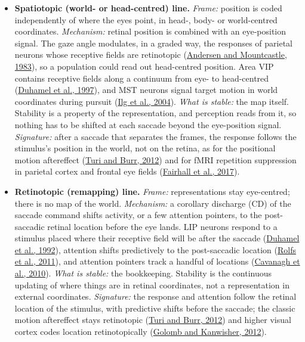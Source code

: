 \documentclass[11pt,a4paper]{article}
\begin{document}
\begin{itemize}[itemsep=4pt,topsep=2pt]
\item \textbf{Spatiotopic (world- or head-centred) line.} \emph{Frame:} position is coded independently of where the eyes point, in head-, body- or world-centred coordinates. \emph{Mechanism:} retinal position is combined with an eye-position signal. The gaze angle modulates, in a graded way, the responses of parietal neurons whose receptive fields are retinotopic (\href{https://doi.org/10.1523/JNEUROSCI.03-03-00532.1983}{Andersen and Mountcastle, 1983}), so a population could read out head-centred position. Area VIP contains receptive fields along a continuum from eye- to head-centred (\href{https://www.nature.com/articles/39865}{Duhamel et al., 1997}), and MST neurons signal target motion in world coordinates during pursuit (\href{https://www.sciencedirect.com/science/article/pii/S0896627304003319}{Ilg et al., 2004}). \emph{What is stable:} the map itself. Stability is a property of the representation, and perception reads from it, so nothing has to be shifted at each saccade beyond the eye-position signal. \emph{Signature:} after a saccade that separates the frames, the response follows the stimulus's position in the world, not on the retina, as for the positional motion aftereffect (\href{https://royalsocietypublishing.org/doi/10.1098/rspb.2012.0637}{Turi and Burr, 2012}) and for fMRI repetition suppression in parietal cortex and frontal eye fields (\href{https://www.sciencedirect.com/science/article/pii/S1053811916306899}{Fairhall et al., 2017}).
\item \textbf{Retinotopic (remapping) line.} \emph{Frame:} representations stay eye-centred; there is no map of the world. \emph{Mechanism:} a corollary discharge (CD) of the saccade command shifts activity, or a few attention pointers, to the post-saccadic retinal location before the eye lands. LIP neurons respond to a stimulus placed where their receptive field will be after the saccade (\href{https://www.science.org/doi/10.1126/science.1553535}{Duhamel et al., 1992}), attention shifts predictively to the post-saccadic location (\href{https://doi.org/10.1038/nn.2711}{Rolfs et al., 2011}), and attention pointers track a handful of locations (\href{https://doi.org/10.1016/j.tics.2010.01.007}{Cavanagh et al., 2010}). \emph{What is stable:} the bookkeeping. Stability is the continuous updating of where things are in retinal coordinates, not a representation in external coordinates. \emph{Signature:} the response and attention follow the retinal location of the stimulus, with predictive shifts before the saccade; the classic motion aftereffect stays retinotopic (\href{https://royalsocietypublishing.org/doi/10.1098/rspb.2012.0637}{Turi and Burr, 2012}) and higher visual cortex codes location retinotopically (\href{https://doi.org/10.1093/cercor/bhr357}{Golomb and Kanwisher, 2012}).
\end{itemize}
\end{document}
